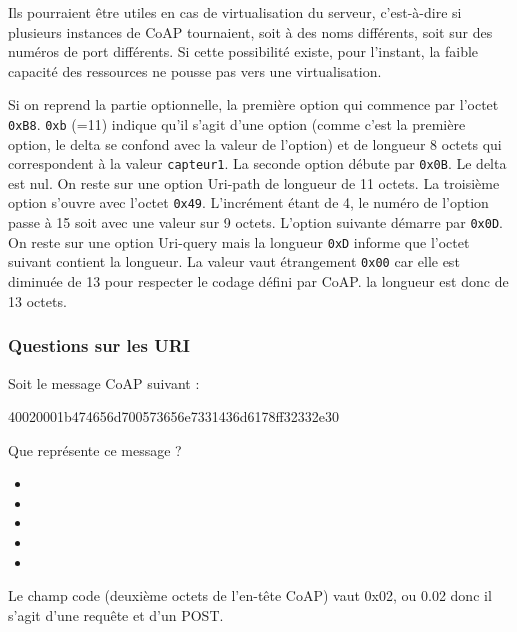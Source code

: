 Ils pourraient être utiles en cas de virtualisation du serveur, c’est-à-dire si plusieurs instances de CoAP tournaient, soit à des noms différents, soit sur des numéros de port différents. Si cette possibilité existe, pour l’instant, la faible capacité des ressources ne pousse pas vers une virtualisation.

         \vspace{1em}

Si on reprend la partie optionnelle, la première option qui commence par l'octet \texttt{0xB8}. \texttt{0xb} (=11) indique qu'il s'agit d'une option  (comme c'est la première option, le delta se confond avec la valeur de l'option) et de longueur 8 octets qui correspondent à la valeur \texttt{capteur1}. La seconde option débute par \texttt{0x0B}. Le delta est nul. On reste sur une option Uri-path de longueur de 11 octets. La troisième option s'ouvre avec l'octet \texttt{0x49}. L'incrément étant de 4, le numéro de l'option passe à 15 soit  avec une valeur sur 9 octets. L'option suivante démarre par \texttt{0x0D}. On reste sur une option Uri-query mais la longueur \texttt{0xD} informe que l'octet suivant contient la longueur. La valeur vaut étrangement \texttt{0x00} car elle est diminuée de 13 pour respecter le codage défini par CoAP. la longueur est donc de 13 octets.

\subsubsection*{Questions sur les URI}

Soit le message CoAP suivant :

\begin{termc}[backgroundcolor=\color{blue!10}, basicstyle=\ttfamily\small, , escapechar=#]
40020001b474656d700573656e7331436d6178ff32332e30
\end{termc}

{
Que représente ce message ?
\begin{itemize}[label=$\circ$]
   \item {}
   \item {}
   \item {}
   \item {}
   \item {}
 \end{itemize}
}
{ Le champ code (deuxième octets de l'en-tête CoAP) vaut 0x02, ou 0.02 donc il s'agit d'une requête et d'un POST.
}

